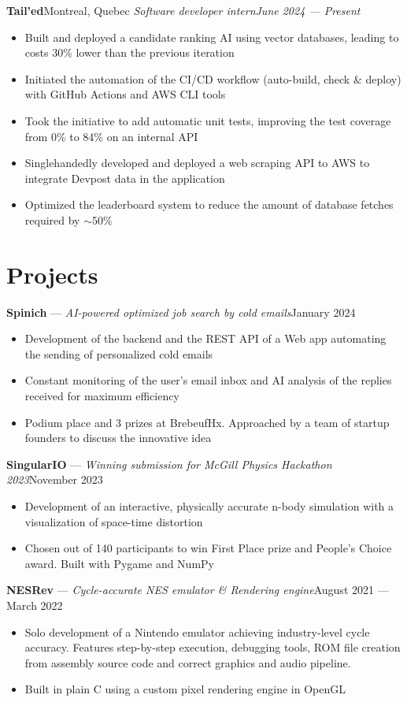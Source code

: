 \documentclass{article}
\newcommand{\newrole}[4]{
    {\normalfont\textbf{#1}\hfill#3}
    \newline
    \textit{#2}\hfill\textit{#4}
}
\newcommand{\shortrole}[3]{
    {\normalfont\textbf{#1} --- \textit{#2}\hfill#3\vspace*{-4pt}}
}
\newenvironment{bulletpoints}{\begin{itemize}\setlength\itemsep{-0.3em}}{\end{itemize}}
\begin{document}
\newrole{Tail'ed}{Software developer intern}{Montreal, Quebec}{June 2024 --- Present}
\begin{bulletpoints}
    \item Built and deployed a candidate ranking AI using vector databases, leading to costs 30\% lower than the previous iteration
    \item Initiated the automation of the CI/CD workflow (auto-build, check \& deploy) with GitHub Actions and AWS CLI tools
    \item Took the initiative to add automatic unit tests, improving the test coverage from 0\% to 84\% on an internal API
    \item Singlehandedly developed and deployed a web scraping API to AWS to integrate Devpost data in the application
    \item Optimized the leaderboard system to reduce the amount of database fetches required by $\sim$50\%
\end{bulletpoints}


\section*{Projects}

\shortrole{Spinich}{AI-powered optimized job search by cold emails}{January 2024}
\begin{bulletpoints}
    \item Development of the backend and the REST API of a Web app automating the sending of personalized cold emails
    \item Constant monitoring of the user's email inbox and AI analysis of the replies received for maximum efficiency
    \item Podium place and 3 prizes at BrebeufHx. Approached by a team of startup founders to discuss the innovative idea
\end{bulletpoints}

\shortrole{SingularIO}{Winning submission for McGill Physics Hackathon 2023}{November 2023}
\begin{bulletpoints}
    \item Development of an interactive, physically accurate n-body simulation with a visualization of space-time distortion
    \item Chosen out of 140 participants to win First Place prize and People’s Choice award. Built with Pygame and NumPy
\end{bulletpoints}

\shortrole{NESRev}{Cycle-accurate NES emulator \& Rendering engine}{August 2021 --- March 2022}
\begin{bulletpoints}
    \item Solo development of a Nintendo emulator achieving industry-level cycle accuracy. Features step-by-step execution, debugging tools, ROM file creation from assembly source code and correct graphics and audio pipeline.
    \item Built in plain C using a custom pixel rendering engine in OpenGL
\end{bulletpoints}
\end{document}
